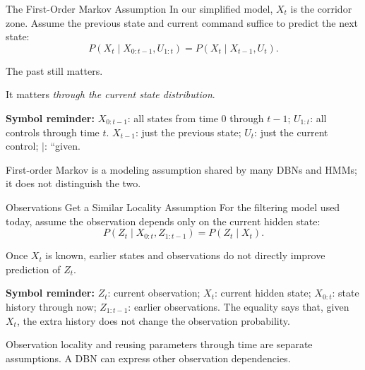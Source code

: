 \documentclass[aspectratio=169,10pt]{beamer}
\newcommand{\equationlegend}[1]{%
  \par\smallskip
  \begingroup
    \setlength{\fboxsep}{5pt}%
    \noindent\colorbox{DeckSoft}{%
      \parbox{\dimexpr\linewidth-2\fboxsep\relax}{%
        \footnotesize\textbf{Symbol reminder:} #1%
      }%
    }\par
  \endgroup
  \smallskip
}
\begin{document}
\begin{frame}[shrink=10]{The First-Order Markov Assumption}
  In our simplified model, $X_t$ is the corridor zone.
  Assume the previous state and current command suffice to predict the next state:
  \[
    P(X_t\mid X_{0:t-1},U_{1:t})
    =P(X_t\mid X_{t-1},U_t).
  \]

  The past still matters.

  It matters \emph{through the current state distribution}.

  \equationlegend{$X_{0:t-1}$: all states from time $0$ through $t-1$; $U_{1:t}$: all controls through time $t$. $X_{t-1}$: just the previous state; $U_t$: just the current control; $\mid$: ``given.}

  \begin{keyidea}
    First-order Markov is a modeling assumption shared by many DBNs and HMMs; it does not distinguish the two.
  \end{keyidea}
\end{frame}

\begin{frame}[shrink=10]{Observations Get a Similar Locality Assumption}
  For the filtering model used today, assume the observation depends only on the current hidden state:
  \[
    P(Z_t\mid X_{0:t},Z_{1:t-1})=P(Z_t\mid X_t).
  \]

  Once $X_t$ is known, earlier states and observations do not directly improve prediction of $Z_t$.

  \equationlegend{$Z_t$: current observation; $X_t$: current hidden state; $X_{0:t}$: state history through now; $Z_{1:t-1}$: earlier observations. The equality says that, given $X_t$, the extra history does not change the observation probability.}

  \begin{keyidea}
    Observation locality and reusing parameters through time are separate assumptions. A DBN can express other observation dependencies.
  \end{keyidea}
\end{frame}
\end{document}
